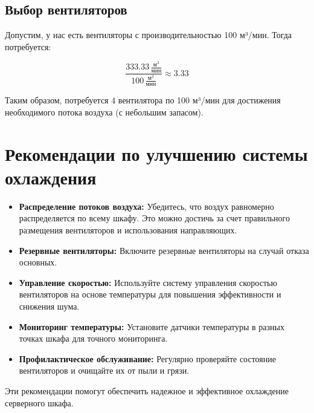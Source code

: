 \subsection{Выбор вентиляторов}

Допустим, у нас есть вентиляторы с производительностью 100 м³/мин. Тогда потребуется:

\[
\frac{333.33 \, \frac{\text{м}^3}{\text{мин}}}{100 \, \frac{\text{м}^3}{\text{мин}}} \approx 3.33
\]

Таким образом, потребуется 4 вентилятора по 100 м³/мин для достижения необходимого потока воздуха (с небольшим запасом).

\section{Рекомендации по улучшению системы охлаждения}

\begin{itemize}
    \item \textbf{Распределение потоков воздуха:} Убедитесь, что воздух равномерно распределяется по всему шкафу. Это можно достичь за счет правильного размещения вентиляторов и использования направляющих.
    \item \textbf{Резервные вентиляторы:} Включите резервные вентиляторы на случай отказа основных.
    \item \textbf{Управление скоростью:} Используйте систему управления скоростью вентиляторов на основе температуры для повышения эффективности и снижения шума.
    \item \textbf{Мониторинг температуры:} Установите датчики температуры в разных точках шкафа для точного мониторинга.
    \item \textbf{Профилактическое обслуживание:} Регулярно проверяйте состояние вентиляторов и очищайте их от пыли и грязи.
\end{itemize}

Эти рекомендации помогут обеспечить надежное и эффективное охлаждение серверного шкафа.

